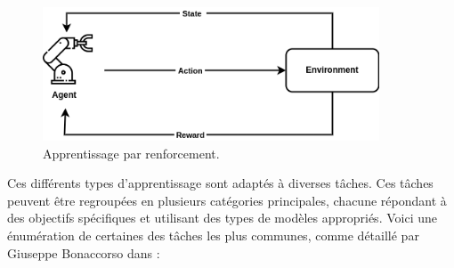 \begin{itemize}
    \begin{figure}[H]
        \centering
        \includegraphics[width=10cm]{gfx/fig-reinforcement-learning.png}
        \caption{Apprentissage par renforcement.}
        \label{fig:reinforcement-learning}
    \end{figure}
\end{itemize}

Ces différents types d'apprentissage sont adaptés à diverses tâches. Ces tâches peuvent être regroupées en plusieurs catégories principales, chacune répondant à des objectifs spécifiques et utilisant des types de modèles appropriés. Voici une énumération de certaines des tâches les plus communes, comme détaillé par Giuseppe Bonaccorso dans \cite{Bonaccorso_2018} :

